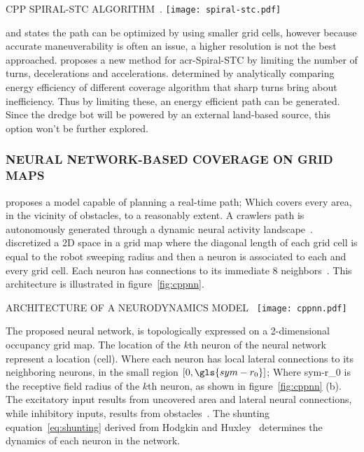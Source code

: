 \begin{RoyalFigure}[!htb, label=]{CPP SPIRAL-STC ALGORITHM~\cite{galceran_survey_2013}.}
    \texttt{[image: spiral-stc.pdf]}
\end{RoyalFigure}

\citet{wong_qualitative_2006} and \citet{lee_smooth_2011} states the path can be optimized by using smaller grid cells,
however because accurate maneuverability is often an issue, a higher resolution is not the best approached.
\citeauthor{lee_smooth_2011} proposes a new method for \gls{acr-Spiral-STC} by limiting the number of turns,
decelerations and accelerations. \citet{mei_energy-efficient_2004} determined by analytically comparing energy
efficiency of different coverage algorithm that sharp turns bring about inefficiency. Thus by limiting these, an energy
efficient path can be generated. Since the dredge bot will be powered by an external land-based source, this option
won't be further explored.

\subsubsection{NEURAL NETWORK-BASED COVERAGE ON GRID MAPS}
\citet{luo_solution_2002} proposes a model capable of planning a real-time path; Which covers every area, in
the vicinity of obstacles, to a reasonably extent. A crawlers path is autonomously generated through a dynamic neural
activity landscape~\cite{luo_solution_2002}\cite{luo_bioinspired_2008}. \citeauthor{luo_solution_2002} discretized a 2D
space in a grid map where the diagonal length of each grid cell is equal to the robot sweeping radius and then a neuron
is associated to each and every grid cell. Each neuron has connections to its immediate 8
neighbors~\cite{galceran_survey_2013}. This architecture is illustrated in figure~\ref{fig:cppnn}.

\begin{RoyalFigure}[!htb, label=fig:cppnn]{ARCHITECTURE OF A NEURODYNAMICS MODEL~\cite{yan_complete_2012}}
    \texttt{[image: cppnn.pdf]}
\end{RoyalFigure}

The proposed neural network, is topologically expressed on a 2-dimensional occupancy grid map. The location of the
\(k\)th neuron of the neural network represent a location (cell). Where each neuron has local lateral connections
to its neighboring neurons, in the small region \( [0,\gls{sym-r_0}] \); Where \gls{sym-r_0} is the receptive field
radius of the \( k \)th neuron, as shown in figure~\ref{fig:cppnn} (b). The excitatory input results from uncovered area
and lateral neural connections, while inhibitory inputs, results from obstacles~\cite{yan_complete_2012}. The shunting
equation~\ref{eq:shunting} derived from Hodgkin and Huxley~\cite{hodgkin_quantitative_1952} determines the dynamics of
each neuron in the network.

